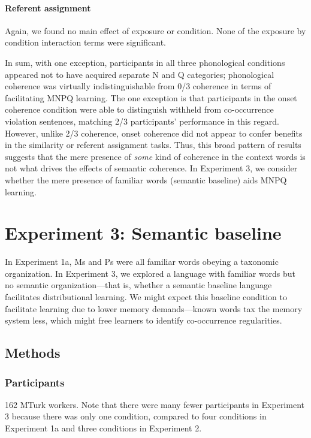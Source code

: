 \documentclass[man,floatsintext]{apa6}
\begin{document}
\paragraph{Referent assignment}
Again, we found no main effect of exposure or condition. None of the exposure by condition interaction terms were significant.

In sum, with one exception, participants in all three phonological conditions appeared not to have acquired separate N and Q categories; phonological coherence was virtually indistinguishable from 0/3 coherence in terms of facilitating MNPQ learning. The one exception is that participants in the onset coherence condition were able to distinguish withheld from co-occurrence violation sentences, matching 2/3 participants' performance in this regard. However, unlike 2/3 coherence, onset coherence did not appear to confer benefits in the similarity or referent assignment tasks. Thus, this broad pattern of results suggests that the mere presence of \emph{some} kind of coherence in the context words is not what drives the effects of semantic coherence. In Experiment 3, we consider whether the mere presence of familiar words (semantic baseline) aids MNPQ learning.

\section{Experiment 3: Semantic baseline}

In Experiment 1a, Ms and Ps were all familiar words obeying a taxonomic organization. In Experiment 3, we explored a language with familiar words but no semantic organization---that is, whether a semantic baseline language facilitates distributional learning. We might expect this baseline condition to facilitate learning due to lower memory demands---known words tax the memory system less, which might free learners to identify co-occurrence regularities.

\subsection{Methods}
\subsubsection{Participants}
162 MTurk workers. Note that there were many fewer participants in Experiment 3 because there was only one condition, compared to four conditions in Experiment 1a and three conditions in Experiment 2.
\end{document}
